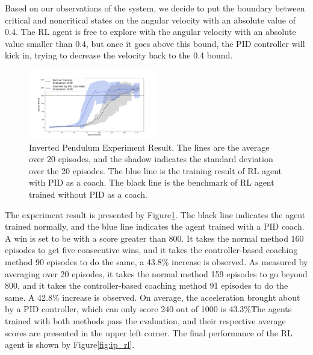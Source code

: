 \documentclass[smallextended]{svjour3}
\begin{document}
Based on our observations of the system, we decide to put the boundary between critical and noncritical states on the angular velocity with an absolute value of 0.4. The RL agent is free to explore with the angular velocity with an absolute value smaller than 0.4, but once it goes above this bound, the PID controller will kick in, trying to decrease the velocity back to the 0.4 bound.
\begin{figure}[H]
     \centering
      \includegraphics[width=0.5\textwidth]{ip.png}
      \caption{Inverted Pendulum Experiment Result. The lines are the average over 20 episodes, and the shadow indicates the standard deviation over the 20 episodes. The blue line is the training result of RL agent with PID as a coach. The black line is the benchmark of RL agent trained without PID as a coach. }
      \label{fig:ip_result}

\end{figure}

The experiment result is presented by Figure\ref{fig:ip_result}. The black line indicates the agent trained normally, and the blue line indicates the agent trained with a PID coach. A win is set to be with a score greater than 800. It takes the normal method 160 episodes to get five consecutive wins, and it takes the controller-based coaching method 90 episodes to do the same, a 43.8\% increase is observed. As measured by averaging over 20 episodes, it takes the normal method 159 episodes to go beyond 800, and it takes the controller-based coaching method 91 episodes to do the same. A 42.8\% increase is observed. On average, the acceleration brought about by a PID controller, which can only score 240 out of 1000 is 43.3\%\. The agents trained with both methods pass the evaluation, and their respective average scores are presented in the upper left corner. The final performance of the RL agent is shown by Figure\ref{fig:ip_rl}.
\end{document}
